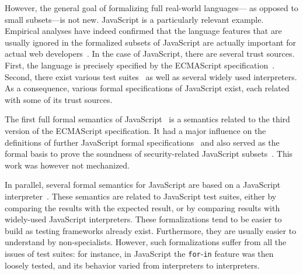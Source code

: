 \documentclass[
    sigplan,
    10pt,
    review, %
    natbib=false %
 ]{acmart}
\begin{document}

However, the general goal of formalizing full real-world languages---%
as opposed to small subsets---is not new.
%
JavaScript is a particularly relevant example.
Empirical analyses
have indeed confirmed that the language features
that are usually ignored in the formalized subsets of JavaScript
are actually important for actual web developers~\parencite{RichardsHBV11}.
%
In the case of JavaScript, there are several trust sources.
First, the language is precisely specified by the ECMAScript specification~\parencite{es2019}.
Second, there exist various test suites~\parencite{test262, mozillatests}
as well as several widely used interpreters.
As a consequence, various formal specifications of JavaScript exist,
each related with some of its trust sources.

The first full formal semantics of JavaScript~\parencite{aplas08}
is a semantics related to the third version of the ECMAScript specification.
It had a major influence on the definitions of further JavaScript formal
specifications~\parencite{usenix, popl14jscert, popl12-Towards, ses} and also served as the formal basis to prove the soundness of security-related
JavaScript subsets~\parencite{mmt-esorics09, mmt-oakland10,MMT-CSF-TR09}.
This work was however not mechanized.

In parallel, several formal semantics
for JavaScript are based on a JavaScript interpreter~\parencite{Guha2010, js-ml,  kjs, Politz:S5}.
These semantics are related to JavaScript test suites,
either by comparing the results with the expected result,
or by comparing results with widely-used JavaScript interpreters.
These formalizations tend to be easier to build
as testing frameworks already exist.
Furthermore, they are usually easier to understand by non-specialists.
However, such formalizations suffer from all the issues of test suites:
for instance, in JavaScript the \texttt{for}-\texttt{in} feature was then loosely tested,
and its behavior varied from interpreters to interpreters.
\end{document}
